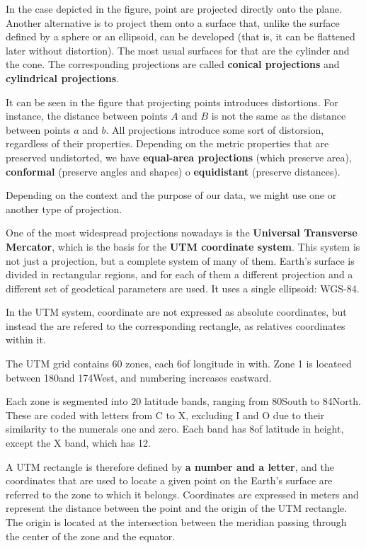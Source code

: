 In the case depicted in the figure, point are projected directly onto the plane. Another alternative is to project them onto a surface that, unlike the surface defined by a sphere or an ellipsoid, can be developed (that is, it can be flattened later without distortion). The most usual surfaces for that are the cylinder and the cone. The corresponding projections are called \textbf{conical projections} and \textbf{cylindrical projections}.

It can be seen in the figure that projecting points introduces distortions. For instance, the distance between points $A$ and $B$ is not the same as the distance between points $a$ and $b$. All projections introduce some sort of distorsion, regardless of their properties. Depending on the metric properties that are preserved undistorted, we have \textbf{equal-area projections} (which preserve area), \textbf{conformal} (preserve angles and shapes) o \textbf{equidistant} (preserve distances).

Depending on the context and the purpose of our data, we might use one or another type of projection. 

One of the most widespread projections nowadays is the \textbf{Universal Transverse Mercator}, which is the basis for the \textbf{UTM coordinate system}. This system is not just a projection, but a complete system of many of them. Earth's surface is divided in rectangular regions, and for each of them a different projection and a different set of geodetical parameters are used. It uses a single ellipsoid: WGS-84.

In the UTM system, coordinate are not expressed as absolute coordinates, but instead the are refered to the corresponding rectangle, as relatives coordinates within it.

The UTM grid contains 60 zones, each 6\degree of longitude in with. Zone 1 is locateed between 180\degree and 174\degree West, and numbering increases eastward.

Each zone is segmented into 20 latitude bands, ranging from 80\degree South to 84\degree North. These are coded with letters from C to X, excluding I and O due to their similarity to the numerals one and zero. Each band has 8\degree of latitude in height, except the X band, which has 12. 

A UTM rectangle is therefore defined by \textbf{a number and a letter}, and the coordinates that are used to locate a given point on the Earth's surface are referred to the zone to which it belongs. Coordinates are expressed in meters and represent the distance between the point and the origin of the UTM rectangle. The origin is located at the intersection between  the meridian passing through the center of the zone and the equator.

